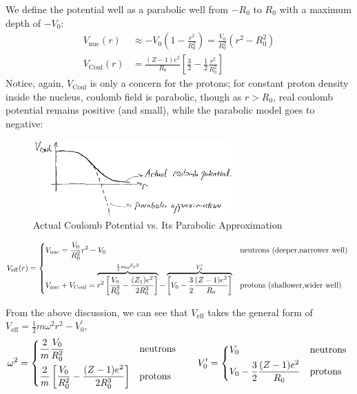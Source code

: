 \documentclass{school-22.101-notes}
\begin{document}
 \label{candidate-potentials}
We define the potential well as a parabolic well from $-R_0$ to $R_0$ with a maximum depth of $-V_0$: 
\begin{align}
V_{\mathrm{nuc}} (r) &\approx - V_0 \left( 1 - \frac{r^2}{R_0^2} \right) = \frac{V_0}{R_0^2} (r^2 - R_0^2)  \\
V_{\mathrm{Coul}} (r) &= \frac{(Z-1) e^2}{R_0} \left[ \frac{3}{2} - \frac{1}{2}  \frac{r^2}{R_0^2}\right] 
\end{align}
Notice, again, $V_{\mathrm{Coul}}$ is only a concern for the protons; for constant proton density inside the nucleus, coulomb field is parabolic, though as $r > R_0$, real coulomb potential remains positive (and small), while the parabolic model goes to negative: 

\begin{figure}[h!]
    \centering
    \includegraphics[width=3in]{images/shell/Vcoul-parabolic-model.png}
    \caption{Actual Coulomb Potential vs. Its Parabolic Approximation}
\end{figure}

\begin{align}
V_{\mathrm{eff}} (r) = 
\begin{dcases*}
V_{\mathrm{nuc}}  = \frac{V_0}{R_0^2} r^2 - V_0 
& neutrons (deeper,narrower well) \\
V_{\mathrm{nuc}} + V_{\mathrm{Coul}} = \overbrace{ r^2 \left[ \frac{V_0}{R_0^2} - \frac{(Z_1)e^2}{2 R_0^3} \right] }^{\frac{1}{2} m \omega^2 r^2} - \overbrace{ \left[  V_0 - \frac{3}{2} \frac{(Z-1) e^2}{R_0} \right] }^{V_0^{\prime} }   & protons (shallower,wider well) 
\end{dcases*}
\end{align}

From the above discussion, we can see that $V_{\mathrm{eff}}$ takes the general form of $\boxed{V_{\mathrm{eff}} = \frac{1}{2} m \omega^2 r^2 - V_0^{\prime}},$ 
\begin{align}
\omega^2 =
\begin{dcases*}
\frac{2}{m} \frac{V_0}{R_0^2}  & neutrons \\
\frac{2}{m} \left[ \frac{V_0}{R_0^2} - \frac{(Z-1) e^2}{2 R_0^3} \right] & protons \\
\end{dcases*}
\fsp \fsp \fsp \fsp \fsp
V_0^{\prime} = 
\begin{dcases*}
V_0 & neutrons \\
V_0 - \frac{3}{2} \frac{(Z-1) e^2}{R_0} & protons \\
\end{dcases*}
\end{align}
\end{document}
